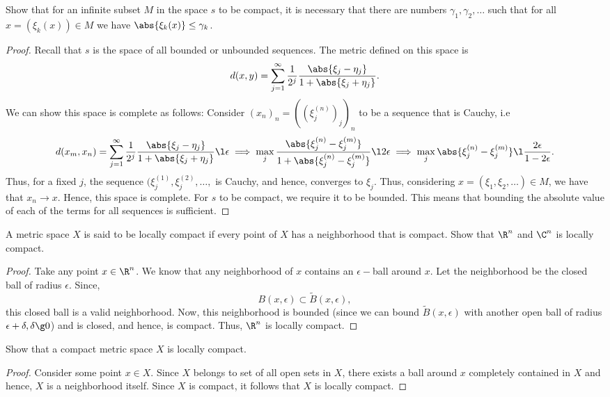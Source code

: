\begin{question}
    Show that for an infinite subset $M$ in the space $s$ to be compact, it is necessary that there are numbers $\gamma_1 , \gamma_2 , \ldots$ such that for all $x = (\xi_k(x)) \in M$ we have $\abs{\xi_k(x)} \leq \gamma_k$.
    \label{section2.5-4}
\end{question}
\begin{proof}
    Recall that $s$ is the space of all bounded or unbounded sequences. The metric defined on this space is 
    \[d(x,y) = \sum_{j=1}^\infty \frac{1}{2^j} \frac{\abs{\xi_j - \eta_j}}{1 + \abs{\xi_j + \eta_j}}.\]
    We can show this space is complete as follows: Consider $(x_n)_n = ((\xi^{(n)}_j)_j)_n$ to be a sequence that is Cauchy, i.e
    \[d(x_m , x_n) = \sum_{j=1}^\infty \frac{1}{2^j} \frac{\abs{\xi_j - \eta_j}}{1 + \abs{\xi_j + \eta_j}} \l \epsilon \implies \max_{j} \frac{\abs{\xi^{(n)}_j - \xi^{(m)}_j}}{1 + \abs{\xi^{(n)}_j - \xi^{(m)}_j}} \l 2\epsilon \implies \max_{j} \abs{\xi^{(n)}_j - \xi^{(m)}_j} \l \frac{2\epsilon}{1 - 2\epsilon}.\]
    Thus, for a fixed $j$, the sequence $(\xi^{(1)}_j , \xi^{(2)}_j, \ldots, $ is Cauchy, and hence, converges to $\xi_j$. Thus, considering $x = (\xi_1 , \xi_2 , \ldots) \in M$, we have that $x_n \rightarrow x$. Hence, this space is complete. For $s$ to be compact, we require it to be bounded. This means that bounding the absolute value of each of the terms for all sequences is sufficient.
\end{proof}

\begin{question}
    A metric space $X$ is said to be locally compact if every point of $X$ has a neighborhood that is compact. Show that $\R^n$ and $\C^n$ is locally compact.
    \label{section2.5-5}
\end{question}
\begin{proof}
    Take any point $x \in \R^n$. We know that any neighborhood of $x$ contains an $\epsilon-$ball around $x$. Let the neighborhood be the closed ball of radius $\epsilon$. Since,
    \[B(x , \epsilon) \subset \tilde{B}(x , \epsilon),\]
    this closed ball is a valid neighborhood. Now, this neighborhood is bounded (since we can bound $\tilde{B}(x , \epsilon)$ with another open ball of radius $\epsilon + \delta, \delta \g 0$) and is closed, and hence, is compact. Thus, $\R^n$ is locally compact.
\end{proof}

\begin{question}
    Show that a compact metric space $X$ is locally compact.
    \label{section2.5-6}
\end{question}
\begin{proof}
    Consider some point $x \in X$. Since $X$ belongs to set of all open sets in $X$, there exists a ball around $x$ completely contained in $X$ and hence, $X$ is a neighborhood itself. Since $X$ is compact, it follows that $X$ is locally compact.
\end{proof}

